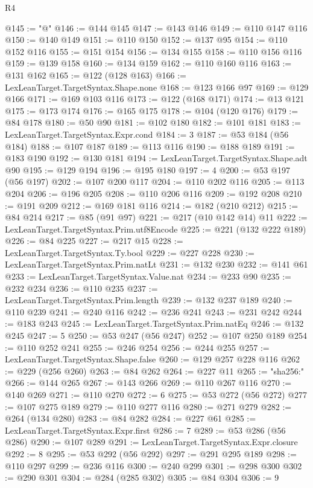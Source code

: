 \begin{lexlean}{R4}
\begin{coremodule}
@145 := "@"
@146 := @144 @145
@147 := @143 @146
@149 := @110 @147 @116
@150 := @140 @149
@151 := @110 @150
@152 := @137 @95
@154 := @110 @152 @116
@155 := @151 @154
@156 := @134 @155
@158 := @110 @156 @116
@159 := @139 @158
@160 := @134 @159
@162 := @110 @160 @116
@163 := @131 @162
@165 := @122 (@128 @163)
@166 := LexLeanTarget.TargetSyntax.Shape.none
@168 := @123 @166 @97
@169 := @129 @166
@171 := @169 @103 @116
@173 := @122 (@168 @171)
@174 := @13 @121
@175 := @173 @174
@176 := @165 @175
@178 := @104 (@120 @176)
@179 := @84 @178
@180 := @50 @90
@181 := @102 @180
@182 := @101 @181
@183 := LexLeanTarget.TargetSyntax.Expr.cond
@184 := 3
@187 := @53 @184 (@56 @184)
@188 := @107 @187
@189 := @113 @116
@190 := @188 @189
@191 := @183 @190
@192 := @130 @181
@194 := LexLeanTarget.TargetSyntax.Shape.adt @90
@195 := @129 @194
@196 := @195 @180
@197 := 4
@200 := @53 @197 (@56 @197)
@202 := @107 @200 @117
@204 := @110 @202 @116
@205 := @113 @204
@206 := @196 @205
@208 := @110 @206 @116
@209 := @192 @208
@210 := @191 @209
@212 := @169 @181 @116
@214 := @182 (@210 @212)
@215 := @84 @214
@217 := @85 (@91 @97)
@221 := @217 (@10 @142 @14) @11
@222 := LexLeanTarget.TargetSyntax.Prim.utf8Encode
@225 := @221 (@132 @222 @189)
@226 := @84 @225
@227 := @217 @15
@228 := LexLeanTarget.TargetSyntax.Ty.bool
@229 := @227 @228
@230 := LexLeanTarget.TargetSyntax.Prim.natLt
@231 := @132 @230
@232 := @141 @61
@233 := LexLeanTarget.TargetSyntax.Value.nat
@234 := @233 @90
@235 := @232 @234
@236 := @110 @235
@237 := LexLeanTarget.TargetSyntax.Prim.length
@239 := @132 @237 @189
@240 := @110 @239
@241 := @240 @116
@242 := @236 @241
@243 := @231 @242
@244 := @183 @243
@245 := LexLeanTarget.TargetSyntax.Prim.natEq
@246 := @132 @245
@247 := 5
@250 := @53 @247 (@56 @247)
@252 := @107 @250 @189
@254 := @110 @252 @241
@255 := @246 @254
@256 := @244 @255
@257 := LexLeanTarget.TargetSyntax.Shape.false
@260 := @129 @257 @228 @116
@262 := @229 (@256 @260)
@263 := @84 @262
@264 := @227 @11
@265 := "sha256:"
@266 := @144 @265
@267 := @143 @266
@269 := @110 @267 @116
@270 := @140 @269
@271 := @110 @270
@272 := 6
@275 := @53 @272 (@56 @272)
@277 := @107 @275 @189
@279 := @110 @277 @116
@280 := @271 @279
@282 := @264 (@134 @280)
@283 := @84 @282
@284 := @227 @61
@285 := LexLeanTarget.TargetSyntax.Expr.first
@286 := 7
@289 := @53 @286 (@56 @286)
@290 := @107 @289
@291 := LexLeanTarget.TargetSyntax.Expr.closure
@292 := 8
@295 := @53 @292 (@56 @292)
@297 := @291 @295 @189
@298 := @110 @297
@299 := @236 @116
@300 := @240 @299
@301 := @298 @300
@302 := @290 @301
@304 := @284 (@285 @302)
@305 := @84 @304
@306 := 9

\end{coremodule}
\end{lexlean}
